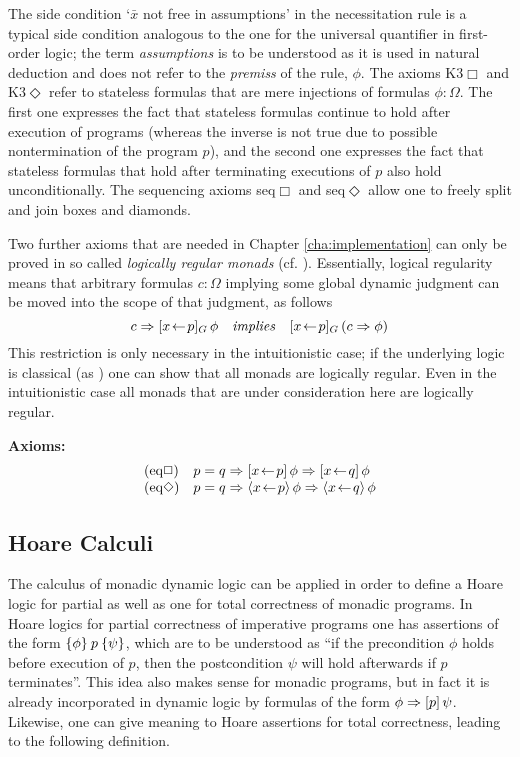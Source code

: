 The side condition `$\bar x$ not free in assumptions' in the necessitation rule
is a typical side condition analogous to the one for the universal quantifier in
first-order logic; the term \emph{assumptions} is to be understood as it is used
in natural deduction and does not refer to the \emph{premiss} of the rule, $\phi$.
The axioms K3$\Box$ and K3$\Diamond$ refer to stateless formulas that are mere
injections of formulas $\phi : \Omega$. The first one expresses the fact that stateless
formulas continue to hold after execution of programs (whereas the inverse is
not true due to possible nontermination of the program $p$), and the second one
expresses the fact that stateless formulas that hold after terminating
executions of $p$ also hold unconditionally. The sequencing axioms seq$\Box$ and
seq$\Diamond$ allow one to freely split and join boxes and diamonds. 


Two further axioms that are needed in Chapter \ref{cha:implementation} can only
be proved in so called \emph{logically regular monads} (cf. \cite[Def.
5.14]{SchroederMossakowski:PDL}). Essentially, logical regularity means that
arbitrary formulas $c : \Omega$ implying some global dynamic judgment can be moved
into the scope of that judgment, as follows
\[
  c \Rightarrow [x\!\gets\! p]_G\,\phi \quad\mathit{implies}\quad 
  [x\!\gets\! p]_G\,(c \Rightarrow \phi)
\]
This restriction is only necessary in the intuitionistic case; if the underlying
logic is classical (as \IsabelleHOL) one can show that all monads are logically
regular. Even in the intuitionistic case all monads that are under consideration
here are logically regular.

\vspace{1.5ex} \noindent  \textbf{Axioms:}
  \begin{displaymath}
    \begin{array}{lll}
      \textrm{(eq$\Box$)} & p = q \Rightarrow \PDLBox{x\leteq p}{\phi} \Rightarrow \PDLBox{x\leteq q}{\phi}\\
      \textrm{(eq$\Diamond$)} & p = q \Rightarrow \PDLDmd{x\leteq p}{\phi} \Rightarrow \PDLDmd{x\leteq q}{\phi}
    \end{array}
  \end{displaymath}

\subsection{Hoare Calculi}
\label{sec:hoare-calculi}

The calculus of monadic dynamic logic can be applied in order to define a Hoare
logic for partial as well as one for total correctness of monadic programs. In
Hoare logics for partial correctness of imperative programs one has assertions
of the form $\{\phi\}\:p\:\{\psi\}$, which are to be understood as ``if the
precondition $\phi$ holds before execution of $p$, then the postcondition $\psi$ will
hold afterwards if $p$ terminates''. This idea also makes sense for monadic
programs, but in fact it is already incorporated in dynamic logic by formulas of
the form $\phi \Rightarrow [p]\,{\psi}$. Likewise, one can give meaning to Hoare assertions
for total correctness, leading to the following definition.

